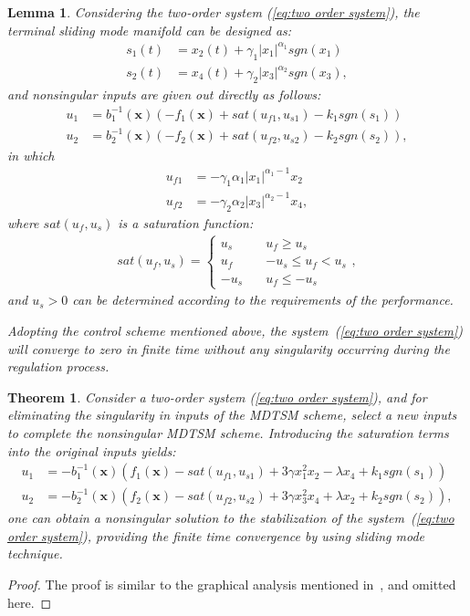 \documentclass[3p]{elsarticle}
\theoremstyle{plain}
\newtheorem{mylem}{Lemma}
\newtheorem{mythm}{Theorem}
\theoremstyle{remark}
\begin{document}
\begin{mylem}\label{lemma:3}
Considering the two-order system (\ref{eq:two order system}), the terminal sliding mode manifold can be designed as:
\begin{align*}
s_1(t) &= x_2(t)+\gamma_1\vert x_1\vert^{\alpha_1}sgn(x_1)\\
s_2(t) &= x_4(t)+\gamma_2\vert x_3\vert^{\alpha_2}sgn(x_3),
\end{align*}
and nonsingular inputs are given out directly as follows:
\begin{align*}
u_1 &= b^{-1}_1(\bm x)(-f_1(\bm x)+sat(u_{f1},u_{s1})-k_1sgn(s_1))\\
u_2 &= b^{-1}_2(\bm x)(-f_2(\bm x)+sat(u_{f2},u_{s2})-k_2sgn(s_2)),
\end{align*}
in which
\begin{align*}
u_{f1}&=-\gamma_1\alpha_1\vert x_1\vert^{\alpha_1-1}x_2\\
u_{f2}&=-\gamma_2\alpha_2\vert x_3\vert^{\alpha_2-1}x_4,
\end{align*}
where $sat(u_f,u_s)$ is a saturation function:
\begin{align}
sat(u_f,u_s)=
\begin{cases}
u_s\quad &u_f\ge u_s\\
u_f\quad &-u_s\le u_f< u_s\\
-u_s\quad &u_f\le -u_s
\end{cases},
\end{align}
and $u_s>0$ can be determined according to the requirements of the performance.\par
Adopting the control scheme mentioned above, the system~(\ref{eq:two order system}) will converge to zero in finite time without any singularity occurring during the regulation process.
\end{mylem}
\begin{mythm}\label{theorem:3}
Consider a two-order system (\ref{eq:two order system}), and for eliminating the singularity in inputs of the MDTSM scheme, select a new inputs to complete the nonsingular MDTSM scheme. Introducing the saturation terms into the original inputs yields:
\begin{align}
u_1 &= -b_1^{-1}(\bm x)(f_1(\bm x)-sat(u_{f1},u_{s1})+3\gamma x_1^2x_2-\lambda x_4+k_1sgn(s_1))\\
u_2 &= -b_2^{-1}(\bm x)(f_2(\bm x)-sat(u_{f2},u_{s2})+3\gamma x_3^2x_4+\lambda x_2+k_2sgn(s_2)),\label{eq:nonsingular modified input}
\end{align}
one can obtain a nonsingular solution to the stabilization of the system~(\ref{eq:two order system}), providing the finite time convergence by using sliding mode technique.
\end{mythm}
\begin{proof}
The proof is similar to the graphical analysis mentioned in~\cite{feng2013nonsingular}, and omitted here.
\end{proof}
\end{document}
